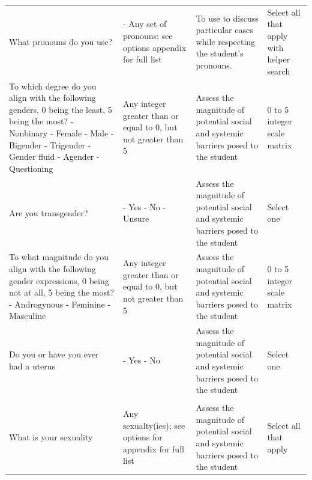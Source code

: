 \documentclass[10pt, twocolumn]{article}
\begin{document}
\begin{xltabular}{\textwidth}{|p{0.3\textwidth}|p{0.3\textwidth}|p{0.2\textwidth}|X|}
     \\ \hline
    What pronouns do you use? & - Any set of pronouns; see options appendix for full list & To use to discuss particular cases while respecting the student's pronouns. & Select all that apply with helper search \\ \hline 
    To which degree do you align with the following genders, 0 being the least, 5 being the most? \newline - Nonbinary \newline - Female \newline - Male \newline - Bigender \newline - Trigender \newline - Gender fluid \newline - Agender \newline - Questioning & Any integer greater than or equal to 0, but not greater than 5 & Assess the magnitude of potential social and systemic barriers posed to the student & 0 to 5 integer scale matrix \\ \hline 
    Are you transgender? & - Yes \newline - No \newline - Unsure & Assess the magnitude of potential social and systemic barriers posed to the student & Select one \\ \hline 
    To what magnitude do you align with the following gender expressions, 0 being not at all, 5 being the most? \newline - Androgynous \newline - Feminine \newline -Masculine & Any integer greater than or equal to 0, but not greater than 5 & Assess the magnitude of potential social and systemic barriers posed to the student & 0 to 5 integer scale matrix \\ \hline 
    Do you or have you ever had a uterus & - Yes \newline - No & Assess the magnitude of potential social and systemic barriers posed to the student & Select one \\ \hline 
     \\ \hline
    What is your sexuality & Any sexualty(ies); see options for appendix for full list & Assess the magnitude of potential social and systemic barriers posed to the student & Select all that apply \\ \hline 

\end{xltabular}
\end{document}
